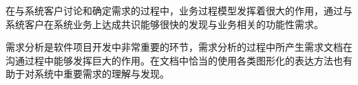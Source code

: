 在与系统客户讨论和确定需求的过程中，业务过程模型发挥着很大的作用，通过与系统客户在系统业务上达成共识能够很快的发现与业务相关的功能性需求。

需求分析是软件项目开发中非常重要的环节，需求分析的过程中所产生需求文档在沟通过程中能够发挥巨大的作用。在文档中恰当的使用各类图形化的表达方法也有助于对系统中重要需求的理解与发现。

